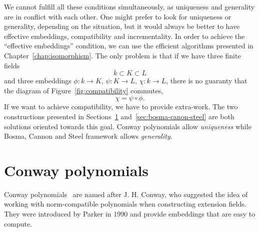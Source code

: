 We cannot fulfill all these conditions simultaneously, as
uniqueness and generality are in conflict with each other. One might prefer to
look for uniqueness or generality, depending on the situation, but it would
always be better to have effective embeddings, compatibility and incrementality.
In order to achieve the ``effective embeddings'' condition, we can use the
efficient algorithms presented in Chapter~\ref{chap:isomorphism}. The only
problem is that if we have three finite fields
\[
  k\subset K\subset L
\]
and three embeddings $\phi:k\to K$, $\psi:K\to L$, $\chi:k\to L$, there is no
guaranty that the diagram of Figure~\ref{fig:compatibility} commutes, \ie
\[
  \chi = \psi\circ\phi.
\]
If we want to achieve compatibility, we have to provide extra-work.
The two constructions presented in Sections~\ref{sec:conway}
and~\ref{sec:bosma-canon-steel} are both solutions oriented towards this goal.
Conway polynomials allow \emph{uniqueness} while Bosma, Cannon and Steel
framework allows \emph{generality}.

\section{Conway polynomials}
\label{sec:conway}

%

Conway polynomials~\cite{Parker90, Scheerhorn92} are named after J. H. Conway,
who suggested the idea of working with norm-compatible polynomials when
constructing extension fields. They were introduced by Parker in 1990 and
provide embeddings that are easy to compute.


